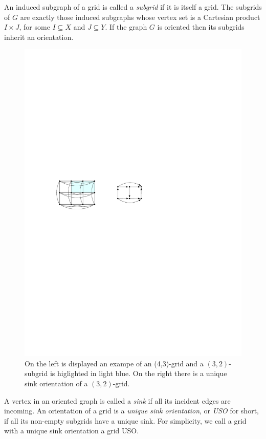 \documentclass[runningheads,a4paper]{llncs}
\begin{document}
An induced subgraph of a grid is called a \emph{subgrid} if it is itself a grid.
The subgrids of $G$ are exactly those induced subgraphs whose vertex set is a
Cartesian product $I \times J$, for some $I \subseteq X$ and $J \subseteq Y$.
If the graph $G$ is oriented then its subgrids inherit an orientation.

  \begin{figure}[htbp] 
  	\centering
  	\includegraphics[scale=1.0]{uso_example.pdf}
  	\caption{\small On the left is displayed an exampe of an (4,3)-grid and a $(3,2)$-subgrid is higlighted in light blue. On the right there is a unique sink orientation of a $(3,2)$-grid.} 
  	\label{fig:examplegrid}
  \end{figure}

A vertex in an oriented graph is called a \emph{sink} if all its incident edges are incoming.
An orientation of a grid is a \emph{unique sink orientation}, or \emph{USO}
for short, if all its non-empty subgrids have a unique sink. For simplicity, we call a grid with a unique sink orientation a grid USO.
\end{document}
